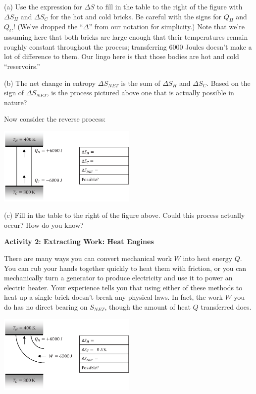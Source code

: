 (a) Use the expression for $\Delta S$ to fill in the table to the right of the figure with $\Delta S_H$ and $\Delta S_C$ for the hot and cold bricks.  Be careful with the signs for $Q_H$ and $Q_C$!  (We've dropped the ``$\Delta$'' from our notation for simplicity.)  Note that we're assuming here that both bricks are large enough that their temperatures remain roughly constant throughout the process; transferring 6000 Joules doesn't make a lot of difference to them.  Our lingo here is that those bodies are hot and cold ``reservoirs.''   
\answerspace{0.2 in}

(b) The net change in entropy $\Delta S_{NET}$ is the sum of $\Delta S_H$ and $\Delta S_C$.  Based on the sign of $\Delta S_{NET}$, is the process pictured above one that is actually possible in nature?
\answerspace{0.6 in}

\pagebreak[2]
Now consider the reverse process:

\begin{center}
\vspace{-0.2 in}
\includegraphics[width=0.5\textwidth]{entropy_is_it_possible/fig2.eps}
\vspace{-0.2 in}
\end{center}

(c) Fill in the table to the right of the figure above.   Could this process actually occur?  How do you know?
\answerspace{0.6 in}

\textbf{Activity 2: Extracting Work: Heat Engines}

There are many ways you can convert mechanical work $W$ into heat energy $Q$.  You can rub your hands together quickly to heat them with friction, or you can mechanically turn a generator to produce electricity and use it to power an electric heater.  Your experience tells you that using either of these methods to heat up a single brick doesn't break any physical laws.  In fact, the work $W$ you do has no direct bearing on $S_{NET}$, though the amount of heat $Q$ transferred does.

\begin{center}
\vspace{-0.2 in}
\includegraphics[width=0.5\textwidth]{entropy_is_it_possible/fig3.eps}
\vspace{-0.2 in}
\end{center}

